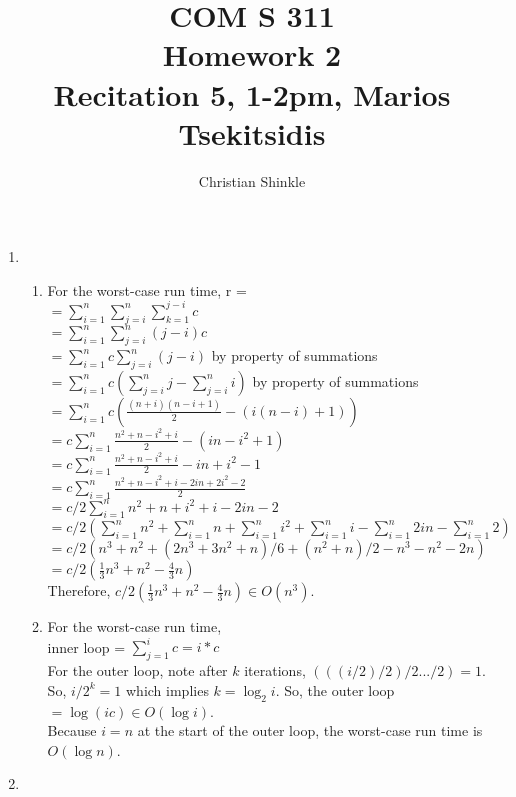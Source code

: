 \documentclass{article}
\begin{document}
 	\title{COM S 311\large \\Homework 2\\Recitation 5, 1-2pm, Marios Tsekitsidis}
	\author{Christian Shinkle}
	\maketitle
	\begin{enumerate}
		\item %
		\begin{enumerate}
			\item For the worst-case run time, r =\\
			$=\sum_{i=1}^{n}\sum_{j=i}^{n}\sum_{k=1}^{j-i}c$\\
			$=\sum_{i=1}^{n}\sum_{j=i}^{n}(j-i)c$\\
			$=\sum_{i=1}^{n}c\sum_{j=i}^{n}(j-i)$ by property of summations\\
			$=\sum_{i=1}^{n}c(\sum_{j=i}^{n}j-\sum_{j=i}^{n}i)$ by property of summations\\
			$=\sum_{i=1}^{n}c(\frac{(n+i)(n-i+1)}{2}-(i(n-i)+1))$\\ 
			$=c\sum_{i=1}^{n}\frac{n^2+n-i^2+i}{2}-(in-i^2+1)$\\
			$=c\sum_{i=1}^{n}\frac{n^2+n-i^2+i}{2}-in+i^2-1$\\
			$=c\sum_{i=1}^{n}\frac{n^2+n-i^2+i-2in+2i^2-2}{2}$\\
			$=c/2\sum_{i=1}^{n}n^2+n+i^2+i-2in-2$\\
			$=c/2(\sum_{i=1}^{n}n^2+\sum_{i=1}^{n}n+\sum_{i=1}^{n}i^2+
			\sum_{i=1}^{n}i-\sum_{i=1}^{n}2in-\sum_{i=1}^{n}2)$\\
			$=c/2(n^3+n^2+(2n^3+3n^2+n)/6+(n^2+n)/2-n^3-n^2-2n)$\\
			$=c/2(\frac{1}{3}n^3+n^2-\frac{4}{3}n)$\\
			Therefore, $c/2(\frac{1}{3}n^3+n^2-\frac{4}{3}n) \in O(n^3)$.
			\item For the worst-case run time, \\
			inner loop = $\sum_{j=1}^ic=i*c$\\
			For the outer loop, note after $k$ iterations, $(((i/2)/2)/2.../2)=1$. So, $i/2^k=1$ which
			implies $k=\log _2i$. So, the outer loop $=\log (ic)\in O(\log i)$.\\
			Because $i=n$ at the start of the outer loop, the worst-case run time is $O(\log n)$.\\
		\end{enumerate}
		\item %
		\begin{enumerate}

\end{enumerate}
\end{enumerate}
\end{document}
